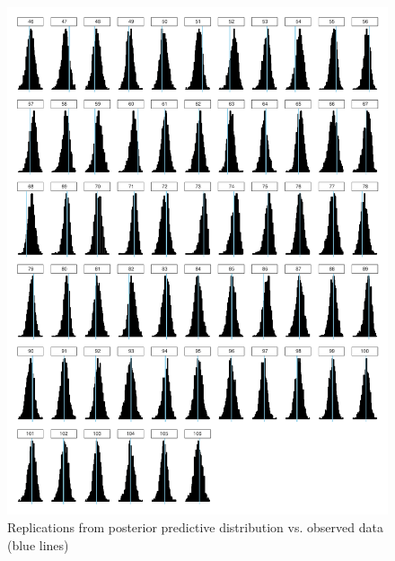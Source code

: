 \begin{figure}
\centering
	\includegraphics[scale=0.75]{sections/figs/ck_pp_nWins_hists}
\caption{Replications from posterior predictive distribution vs. observed data (blue lines)}
\label{fig:ck_pp_nWins_hists}
\end{figure}



